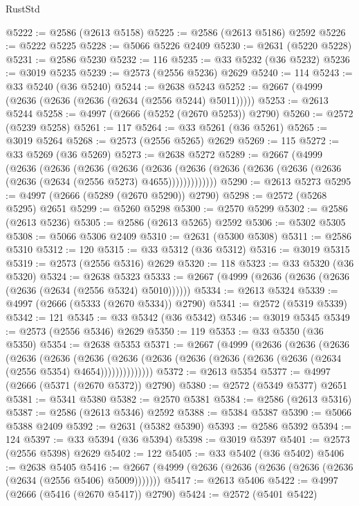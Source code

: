 \begin{lexlean}{RustStd}
\begin{coremodule}
@5222 := @2586 (@2613 @5158)
@5225 := @2586 (@2613 @5186) @2592
@5226 := @5222 @5225
@5228 := @5066 @5226 @2409
@5230 := @2631 (@5220 @5228)
@5231 := @2586 @5230
@5232 := 116
@5235 := @33 @5232 (@36 @5232)
@5236 := @3019 @5235
@5239 := @2573 (@2556 @5236) @2629
@5240 := 114
@5243 := @33 @5240 (@36 @5240)
@5244 := @2638 @5243
@5252 := @2667 (@4999 (@2636 (@2636 (@2636 (@2634 (@2556 @5244) @5011)))))
@5253 := @2613 @5244
@5258 := @4997 (@2666 (@5252 (@2670 @5253)) @2790)
@5260 := @2572 (@5239 @5258)
@5261 := 117
@5264 := @33 @5261 (@36 @5261)
@5265 := @3019 @5264
@5268 := @2573 (@2556 @5265) @2629
@5269 := 115
@5272 := @33 @5269 (@36 @5269)
@5273 := @2638 @5272
@5289 := @2667
    (@4999
      (@2636
        (@2636
          (@2636
            (@2636
              (@2636
                (@2636 (@2636 (@2636 (@2636 (@2636 (@2636 (@2634 (@2556 @5273) @4655)))))))))))))
@5290 := @2613 @5273
@5295 := @4997 (@2666 (@5289 (@2670 @5290)) @2790)
@5298 := @2572 (@5268 @5295) @2651
@5299 := @5260 @5298
@5300 := @2570 @5299
@5302 := @2586 (@2613 @5236)
@5305 := @2586 (@2613 @5265) @2592
@5306 := @5302 @5305
@5308 := @5066 @5306 @2409
@5310 := @2631 (@5300 @5308)
@5311 := @2586 @5310
@5312 := 120
@5315 := @33 @5312 (@36 @5312)
@5316 := @3019 @5315
@5319 := @2573 (@2556 @5316) @2629
@5320 := 118
@5323 := @33 @5320 (@36 @5320)
@5324 := @2638 @5323
@5333 := @2667 (@4999 (@2636 (@2636 (@2636 (@2636 (@2634 (@2556 @5324) @5010))))))
@5334 := @2613 @5324
@5339 := @4997 (@2666 (@5333 (@2670 @5334)) @2790)
@5341 := @2572 (@5319 @5339)
@5342 := 121
@5345 := @33 @5342 (@36 @5342)
@5346 := @3019 @5345
@5349 := @2573 (@2556 @5346) @2629
@5350 := 119
@5353 := @33 @5350 (@36 @5350)
@5354 := @2638 @5353
@5371 := @2667
    (@4999
      (@2636
        (@2636
          (@2636
            (@2636
              (@2636
                (@2636
                  (@2636 (@2636 (@2636 (@2636 (@2636 (@2636 (@2634 (@2556 @5354) @4654))))))))))))))
@5372 := @2613 @5354
@5377 := @4997 (@2666 (@5371 (@2670 @5372)) @2790)
@5380 := @2572 (@5349 @5377) @2651
@5381 := @5341 @5380
@5382 := @2570 @5381
@5384 := @2586 (@2613 @5316)
@5387 := @2586 (@2613 @5346) @2592
@5388 := @5384 @5387
@5390 := @5066 @5388 @2409
@5392 := @2631 (@5382 @5390)
@5393 := @2586 @5392
@5394 := 124
@5397 := @33 @5394 (@36 @5394)
@5398 := @3019 @5397
@5401 := @2573 (@2556 @5398) @2629
@5402 := 122
@5405 := @33 @5402 (@36 @5402)
@5406 := @2638 @5405
@5416 := @2667 (@4999 (@2636 (@2636 (@2636 (@2636 (@2636 (@2634 (@2556 @5406) @5009)))))))
@5417 := @2613 @5406
@5422 := @4997 (@2666 (@5416 (@2670 @5417)) @2790)
@5424 := @2572 (@5401 @5422)

\end{coremodule}
\end{lexlean}
